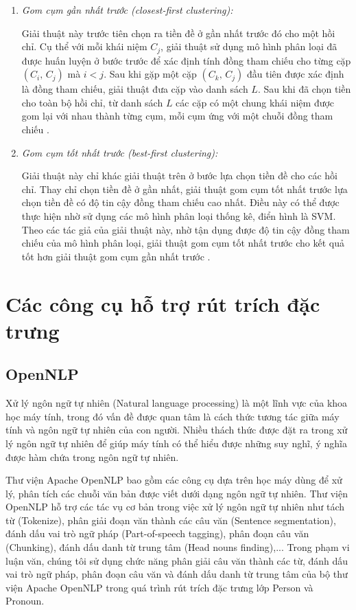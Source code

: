 \begin{enumerate}
\item \emph{Gom cụm gần nhất trước (closest-first clustering):}

Giải thuật này trước tiên chọn ra tiền đề ở gần nhất trước đó cho một hồi chỉ. Cụ thể với mỗi khái niệm $C_j$, giải thuật sử dụng mô hình phân loại đã được huấn luyện ở bước trước để xác định tính đồng tham chiếu cho từng cặp $(C_i,\,C_j)$ mà $i<j$. Sau khi gặp một cặp $(C_k,\,C_j)$ đầu tiên được xác định là đồng tham chiếu, giải thuật đưa cặp vào danh sách $L$. Sau khi đã chọn tiền cho toàn bộ hồi chỉ, từ danh sách $L$ các cặp có một chung khái niệm được gom lại với nhau thành từng cụm, mỗi cụm ứng với một chuỗi đồng tham chiếu \cite{Soon2001}.
\item \emph{Gom cụm tốt nhất trước (best-first clustering):}

Giải thuật này chỉ khác giải thuật trên ở bước lựa chọn tiền đề cho các hồi chỉ. Thay chỉ chọn tiền đề ở gần nhất, giải thuật gom cụm tốt nhất trước lựa chọn tiền đề có độ tin cậy đồng tham chiếu cao nhất. Điều này có thể được thực hiện nhờ sử dụng các mô hình phân loại thống kê, điển hình là SVM. Theo các tác giả của giải thuật này, nhờ tận dụng được độ tin cậy đồng tham chiếu của mô hình phân loại, giải thuật gom cụm tốt nhất trước cho kết quả tốt hơn giải thuật gom cụm gần nhất trước \cite{VincentNg2002a}.
\end{enumerate}

\section{Các công cụ hỗ trợ rút trích đặc trưng} \label{tools}

\subsection*{OpenNLP}
Xử lý ngôn ngữ tự nhiên (Natural language processing) là một lĩnh vực của khoa học máy tính, trong đó vấn đề được quan tâm là cách thức tương tác giữa máy tính và ngôn ngữ tự nhiên của con người. Nhiều thách thức được đặt ra trong xử lý ngôn ngữ tự nhiên để giúp máy tính có thể hiểu được những suy nghĩ, ý nghĩa được hàm chứa trong ngôn ngữ tự nhiên.

Thư viện Apache OpenNLP bao gồm các công cụ dựa trên học máy dùng để xử lý, phân tích các chuỗi văn bản được viết dưới dạng ngôn ngữ tự nhiên. Thư viện OpenNLP hỗ trợ các tác vụ cơ bản trong việc xử lý ngôn ngữ tự nhiên như tách từ (Tokenize), phân giải đoạn văn thành các câu văn (Sentence segmentation), đánh dấu vai trò ngữ pháp (Part-of-speech tagging), phân đoạn câu văn (Chunking), đánh dấu danh từ trung tâm (Head nouns finding),... Trong phạm vi luận văn, chúng tôi sử dụng chức năng phân giải câu văn thành các từ, đánh dấu vai trò ngữ pháp, phân đoạn câu văn và đánh dấu danh từ trung tâm của bộ thư viện Apache OpenNLP trong quá trình rút trích đặc trưng lớp Person và Pronoun.

